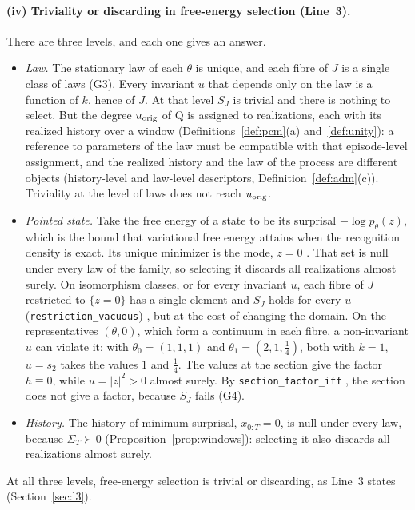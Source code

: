 \paragraph{(iv) Triviality or discarding in free-energy selection (Line~3).} There are three levels, and each one gives an answer.
\begin{itemize}
\item \emph{Law.} The stationary law of each $\theta$ is unique, and each fibre of $J$ is a single class of laws (G3). Every invariant $u$ that depends only on the law is a function of $k$, hence of $J$. At that level $S_J$ is trivial and there is nothing to select. But the degree $u_{\rm orig}$ of Q is assigned to realizations, each with its realized history over a window (Definitions~\ref{def:pcm}(a) and~\ref{def:unity}): a reference to parameters of the law must be compatible with that episode-level assignment, and the realized history and the law of the process are different objects (history-level and law-level descriptors, Definition~\ref{def:adm}(c)). Triviality at the level of laws does not reach $u_{\rm orig}$.
\item \emph{Pointed state.} Take the free energy of a state to be its surprisal $-\log p_\theta(z)$, which is the bound that variational free energy attains when the recognition density is exact. Its unique minimizer is the mode, $z=0$ \stS. That set is null under every law of the family, so selecting it discards all realizations almost surely. On isomorphism classes, or for every invariant $u$, each fibre of $J$ restricted to $\{z=0\}$ has a single element and $S_J$ holds for every $u$ (\texttt{restriction\_vacuous}) \stL, but at the cost of changing the domain. On the representatives $(\theta,0)$, which form a continuum in each fibre, a non-invariant $u$ can violate it: with $\theta_0=(1,1,1)$ and $\theta_1=(2,1,\tfrac14)$, both with $k=1$, $u=s_2$ takes the values $1$ and $\tfrac14$. The values at the section give the factor $h\equiv0$, while $u=|z|^2>0$ almost surely. By \texttt{section\_factor\_iff} \stL, the section does not give a factor, because $S_J$ fails (G4).
\item \emph{History.} The history of minimum surprisal, $x_{0:T}=0$, is null under every law, because $\Sigma_T\succ0$ (Proposition~\ref{prop:windows}): selecting it also discards all realizations almost surely.
\end{itemize}
At all three levels, free-energy selection is trivial or discarding, as Line~3 states (Section~\ref{sec:l3}).

